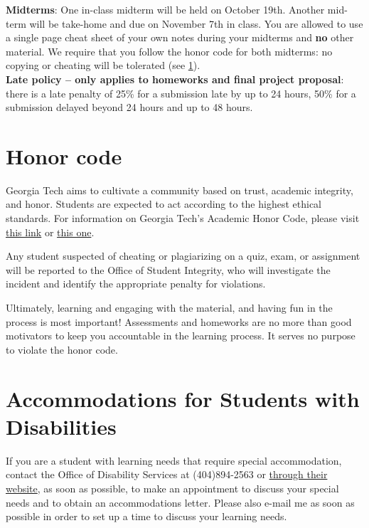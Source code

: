 \documentclass[12pt]{article}
\begin{document}
\textbf{Midterms}: One in-class midterm will be held on October 19th. Another mid-term will be take-home and due on November 7th in class. You are allowed to use a single page cheat sheet of your own notes during your midterms and \textbf{no} other material. We require that you follow the honor code for both midterms: no copying or cheating will be tolerated (see \ref{sec:honor}).\\

\textbf{Late policy -- only applies to homeworks and final project proposal}: there is a late penalty of 25\% for a submission late by up to 24 hours, 50\% for a submission delayed beyond 24 hours and up to 48 hours. 

\section{Honor code}
\label{sec:honor}

Georgia Tech aims to cultivate a community based on trust, academic integrity, and honor. Students are expected to act according to the highest ethical standards.  For information on Georgia Tech's Academic Honor Code, please visit \href{http://www.catalog.gatech.edu/policies/honor-code/}{this link} or \href{http://www.catalog.gatech.edu/rules/18/}{this one}. 

Any student suspected of cheating or plagiarizing on a quiz, exam, or assignment will be reported to the Office of Student Integrity, who will investigate the incident and identify the appropriate penalty for violations.

Ultimately, learning and engaging with the material, and having fun in the process is most important! Assessments and homeworks are no more than good motivators to keep you accountable in the learning process. It serves no purpose to violate the honor code. 

\section{Accommodations for Students with Disabilities} 

If you are a student with learning needs that require special accommodation, contact the Office of Disability Services at (404)894-2563 or \href{http://disabilityservices.gatech.edu/}{through their website}, as soon as possible, to make an appointment to discuss your special needs and to obtain an accommodations letter.  Please also e-mail me as soon as possible in order to set up a time to discuss your learning needs. 
\end{document}
